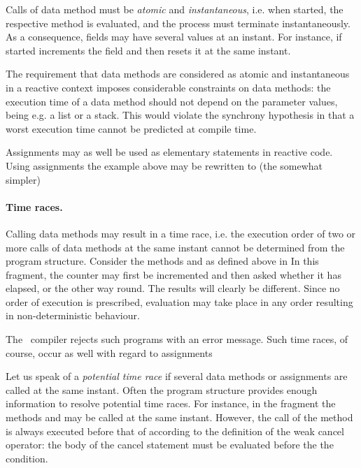 Calls of data method must be \emph{atomic}
 and \emph{instantaneous}, i.e.
when started, the respective method is evaluated, and the
process must terminate instantaneously.
As a consequence, fields may have several values at an instant. For 
instance, if started
%
% 
increments the field  and then resets it at the same 
instant.

The requirement that 
data methods are considered as atomic and instantaneous in a reactive 
context imposes considerable constraints on data methods: 
the execution time of a data method should not depend on the parameter values, being e.g. a 
list or a stack. This would violate the synchrony hypothesis in that 
a worst execution time cannot be predicted at compile time.

Assignments may as well be used as elementary statements in reactive
code. Using assignments the example above may be rewritten to (the
somewhat simpler)
%
%

\paragraph{Time races.} Calling data methods may result in a time
race, i.e. the execution order of two or more calls of data
methods at the same instant cannot be determined from the program structure. Consider the methods  and  as defined above in
%
% 
In this fragment, the counter may first be incremented and 
then asked whether it has elapsed, or the other way round. 
The results will clearly be different. Since no order of execution is prescribed, evaluation may take place in any order resulting in non-deterministic behaviour. 

The \se\ compiler rejects such programs with an error message. Such time races, of course, occur as well with regard to assignments
%
%  

Let us speak of a \emph{potential time race}
 if several data methods or
assignments are called at the same instant. Often the program structure
provides enough information to resolve potential time races. For instance, in the fragment
%
%
the methods  and  may be called at the same instant. However, the call of the method  is always executed
 before that of  according to the definition of the weak 
 cancel operator: the body of the cancel statement must be evaluated before
 the the condition.


